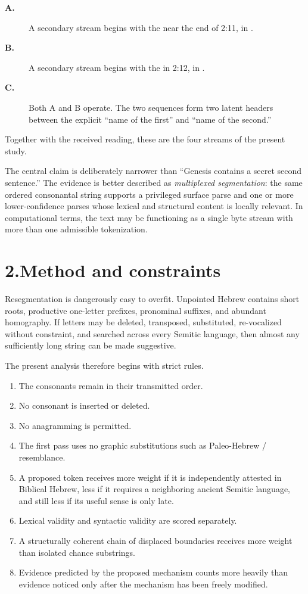 \begin{description}
\item[\textbf{A.}] A secondary stream begins with the  near the end of 2:11, in .
\item[\textbf{B.}] A secondary stream begins with the  in 2:12, in .
\item[\textbf{C.}] Both A and B operate.  The two  sequences form two latent headers between the explicit ``name of the first'' and ``name of the second.''
\end{description}

Together with the received reading, these are the four streams of the present study.

The central claim is deliberately narrower than ``Genesis contains a secret second sentence.''  The evidence is better described as \emph{multiplexed segmentation}: the same ordered consonantal string supports a privileged surface parse and one or more lower-confidence parses whose lexical and structural content is locally relevant.  In computational terms, the text may be functioning as a single byte stream with more than one admissible tokenization.

\section*{2.\quad Method and constraints}

Resegmentation is dangerously easy to overfit.  Unpointed Hebrew contains short roots, productive one-letter prefixes, pronominal suffixes, and abundant homography.  If letters may be deleted, transposed, substituted, re-vocalized without constraint, and searched across every Semitic language, then almost any sufficiently long string can be made suggestive.

The present analysis therefore begins with strict rules.

\begin{enumerate}
\item The consonants remain in their transmitted order.
\item No consonant is inserted or deleted.
\item No anagramming is permitted.
\item The first pass uses no graphic substitutions such as Paleo-Hebrew / resemblance.
\item A proposed token receives more weight if it is independently attested in Biblical Hebrew, less if it requires a neighboring ancient Semitic language, and still less if its useful sense is only late.
\item Lexical validity and syntactic validity are scored separately.
\item A structurally coherent chain of displaced boundaries receives more weight than isolated chance substrings.
\item Evidence predicted by the proposed mechanism counts more heavily than evidence noticed only after the mechanism has been freely modified.
\end{enumerate}

